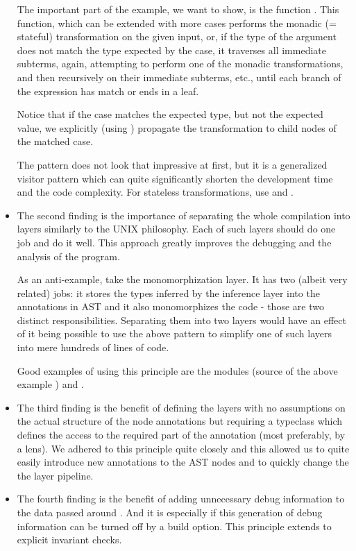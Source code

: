 \begin{itemize}
\begin{ex}
        The important part of the example, we want to show, is the function \linebreak {}. This function, which can be extended with more  cases performs the monadic (= stateful) transformation  on the given input, or, if the type of the argument does not match the type expected by the case, it traverses all immediate subterms, again, attempting to perform one of the monadic transformations, and then recursively on their immediate subterms, etc., until each branch of the expression has match or ends in a leaf.

        Notice that if the case matches the expected type, but not the expected value, we explicitly (using ) propagate the transformation to child nodes of the matched case.
    \end{ex}

    The  pattern does not look that impressive at first, but it is a generalized visitor pattern which can quite significantly shorten the development time and the code complexity. For stateless transformations, use  and .

    \item The second finding is the importance of separating the whole compilation into layers similarly to the UNIX philosophy. Each of such layers should do one job and do it well. This approach greatly improves the debugging and the analysis of the program.

    As an anti-example, take the monomorphization layer. It has two (albeit very related) jobs: it stores the types inferred by the inference layer into the annotations in AST and it also monomorphizes the code - those are two distinct responsibilities. Separating them into two layers would have an effect of it being possible to use the above pattern to simplify one of such layers into mere hundreds of lines of code.

    Good examples of using this principle are the modules  (source of the above example ) and .

    \item The third finding is the benefit of defining the layers with no assumptions on the actual structure of the node annotations but requiring a typeclass which defines the access to the required part of the annotation (most preferably, by a lens). We adhered to this principle quite closely and this allowed us to quite easily introduce new annotations to the AST nodes and to quickly change the the layer pipeline.

    \item The fourth finding is the benefit of adding unnecessary debug information to the data passed around . And it is especially if this generation of debug information can be turned off by a build option. This principle extends to explicit invariant checks.

\end{itemize}
